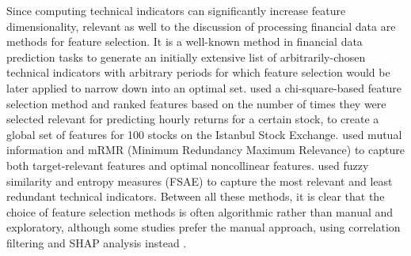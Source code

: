 \documentclass[stu,floatsintext]{apa7}
\begin{document}
Since computing technical indicators can significantly increase feature dimensionality, relevant as well to the discussion of processing financial data are methods for feature selection. It is a well-known method in financial data prediction tasks to generate an initially extensive list of arbitrarily-chosen technical indicators with arbitrary periods for which feature selection would be later applied to narrow down into an optimal set. \textcite{gunduz2017intraday} used a chi-square-based feature selection method and ranked features based on the number of times they were selected relevant for predicting hourly returns for a certain stock, to create a global set of features for 100 stocks on the Istanbul Stock Exchange. \textcite{kong2020predicting} used mutual information and mRMR (Minimum Redundancy Maximum Relevance) to capture both target-relevant features and optimal noncollinear features. \textcite{lohrmann2018classification} used fuzzy similarity and entropy measures (FSAE) to capture the most relevant and least redundant technical indicators. Between all these methods, it is clear that the choice of feature selection methods is often algorithmic rather than manual and exploratory, although some studies prefer the manual approach, using correlation filtering and SHAP analysis instead \parencite{dashtaki2025hsif}.
\end{document}
